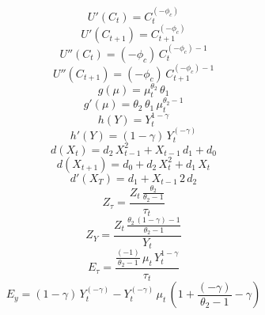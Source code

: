 \begin{dmath*}
{U'(C_t)} = {{C}}_{t}^{\left(-{{\phi_c}}\right)}
\end{dmath*}
\begin{dmath*}
{U'(C_{t+1})} = {{C}}_{t+1}^{\left(-{{\phi_c}}\right)}
\end{dmath*}
\begin{dmath*}
{U''(C_t)} = \left(-{{\phi_c}}\right)\, {{C}}_{t}^{\left(-{{\phi_c}}\right)-1}
\end{dmath*}
\begin{dmath*}
{U''(C_{t+1})} = \left(-{{\phi_c}}\right)\, {{C}}_{t+1}^{\left(-{{\phi_c}}\right)-1}
\end{dmath*}
\begin{dmath*}
g(\mu) = {{\mu}}_{t}^{{{\theta_2}}}\, {{\theta_1}}
\end{dmath*}
\begin{dmath*}
g'(\mu) = {{\theta_2}}\, {{\theta_1}}\, {{\mu}}_{t}^{{{\theta_2}}-1}
\end{dmath*}
\begin{dmath*}
{h(Y)} = {{Y}}_{t}^{1-{{\gamma}}}
\end{dmath*}
\begin{dmath*}
{h'(Y)} = \left(1-{{\gamma}}\right)\, {{Y}}_{t}^{\left(-{{\gamma}}\right)}
\end{dmath*}
\begin{dmath*}
{d(X_t)} = {{d_2}}\, {{X}}_{t-1}^{2}+{{X}}_{t-1}\, {{d_1}}+{{d_0}}
\end{dmath*}
\begin{dmath*}
{d(X_{t+1})} = {{d_0}}+{{d_2}}\, {{X}}_{t}^{2}+{{d_1}}\, {{X}}_{t}
\end{dmath*}
\begin{dmath*}
{d'(X_T)} = {{d_1}}+{{X}}_{t-1}\, 2\, {{d_2}}
\end{dmath*}
\begin{dmath*}
{Z_\tau} = \frac{{{Z}}_{t}\, \frac{{{\theta_2}}}{{{\theta_2}}-1}}{{{\tau}}_{t}}
\end{dmath*}
\begin{dmath*}
{Z_Y} = \frac{{{Z}}_{t}\, \frac{{{\theta_2}}\, \left(1-{{\gamma}}\right)-1}{{{\theta_2}}-1}}{{{Y}}_{t}}
\end{dmath*}
\begin{dmath*}
{E_\tau} = \frac{\frac{\left(-1\right)}{{{\theta_2}}-1}\, {{\mu}}_{t}\, {{Y}}_{t}^{1-{{\gamma}}}}{{{\tau}}_{t}}
\end{dmath*}
\begin{dmath*}
{E_y} = \left(1-{{\gamma}}\right)\, {{Y}}_{t}^{\left(-{{\gamma}}\right)}-{{Y}}_{t}^{\left(-{{\gamma}}\right)}\, {{\mu}}_{t}\, \left(1+\frac{\left(-{{\gamma}}\right)}{{{\theta_2}}-1}-{{\gamma}}\right)
\end{dmath*}
